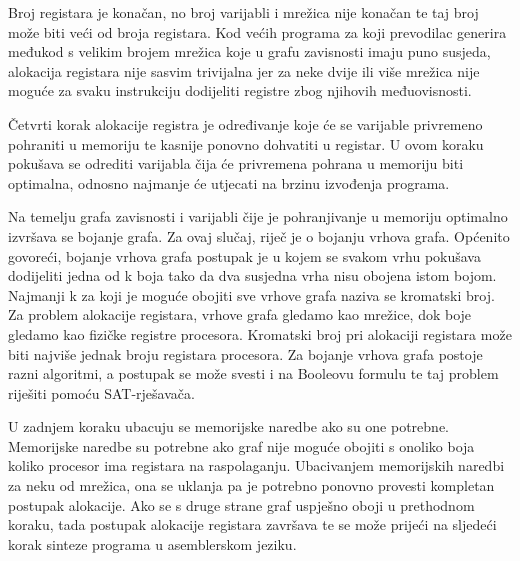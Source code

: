 \documentclass[hidelinks, conference]{IEEEtran}
\begin{document}
Broj registara je konačan, no broj varijabli i mrežica nije konačan te taj broj može biti veći od broja registara. Kod većih programa za koji prevodilac generira međukod s velikim brojem mrežica koje u grafu zavisnosti imaju puno susjeda, alokacija registara nije sasvim trivijalna jer za neke dvije ili više mrežica nije moguće za svaku instrukciju dodijeliti registre zbog njihovih međuovisnosti.

Četvrti korak alokacije registra je određivanje koje će se varijable privremeno pohraniti u memoriju te kasnije ponovno dohvatiti u registar. U ovom koraku pokušava se odrediti varijabla čija će privremena pohrana u memoriju biti optimalna, odnosno najmanje će utjecati na brzinu izvođenja programa.
 
Na temelju grafa zavisnosti i varijabli čije je pohranjivanje u memoriju optimalno izvršava se bojanje grafa. Za ovaj slučaj, riječ je o bojanju vrhova grafa. Općenito govoreći, bojanje vrhova grafa postupak je u kojem se svakom vrhu pokušava dodijeliti jedna od k boja tako da dva susjedna vrha nisu obojena istom bojom. Najmanji k za koji je moguće obojiti sve vrhove grafa naziva se kromatski broj. Za problem alokacije registara, vrhove grafa gledamo kao mrežice, dok boje gledamo kao fizičke registre procesora. Kromatski broj pri alokaciji registara može biti najviše jednak broju registara procesora. Za bojanje vrhova grafa postoje razni algoritmi, a postupak se može svesti i na Booleovu formulu te taj problem riješiti pomoću SAT-rješavača.
 
U zadnjem koraku ubacuju se memorijske naredbe ako su one potrebne. Memorijske naredbe su potrebne ako graf nije moguće obojiti s onoliko boja koliko procesor ima registara na raspolaganju. Ubacivanjem memorijskih naredbi za neku od mrežica, ona se uklanja pa je potrebno ponovno provesti kompletan postupak alokacije. Ako se s druge strane graf uspješno oboji u prethodnom koraku, tada postupak alokacije registara završava te se može prijeći na sljedeći korak sinteze programa u asemblerskom jeziku.
\end{document}
